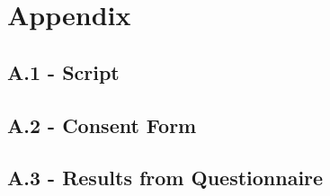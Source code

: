 \chapter{Appendix}\label{ch:appAlabel}

\section*{A.1 - Script}
\section*{A.2 - Consent Form}
\section*{A.3 - Results from Questionnaire}

\clearpage



